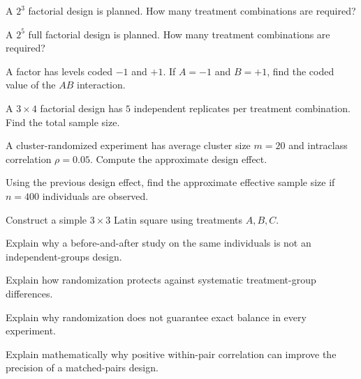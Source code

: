 \begin{exercise}[2]
A \(2^3\) factorial design is planned. How many treatment combinations
are required?
\end{exercise}

\begin{exercise}[2]
A \(2^5\) full factorial design is planned. How many treatment
combinations are required?
\end{exercise}

\begin{exercise}[2]
A factor has levels coded \(-1\) and \(+1\). If \(A=-1\) and \(B=+1\),
find the coded value of the \(AB\) interaction.
\end{exercise}

\begin{exercise}[2]
A \(3\times4\) factorial design has \(5\) independent replicates per
treatment combination. Find the total sample size.
\end{exercise}

\begin{exercise}[2]
A cluster-randomized experiment has average cluster size \(m=20\) and
intraclass correlation \(\rho=0.05\). Compute the approximate design
effect.
\end{exercise}

\begin{exercise}[2]
Using the previous design effect, find the approximate effective sample
size if \(n=400\) individuals are observed.
\end{exercise}

\begin{exercise}[2]
Construct a simple \(3\times3\) Latin square using treatments \(A,B,C\).
\end{exercise}

\begin{exercise}[2]
Explain why a before-and-after study on the same individuals is not an
independent-groups design.
\end{exercise}

\begin{exercise}[3]
Explain how randomization protects against systematic treatment-group
differences.
\end{exercise}

\begin{exercise}[3]
Explain why randomization does not guarantee exact balance in every
experiment.
\end{exercise}

\begin{exercise}[3]
Explain mathematically why positive within-pair correlation can improve
the precision of a matched-pairs design.
\end{exercise}

